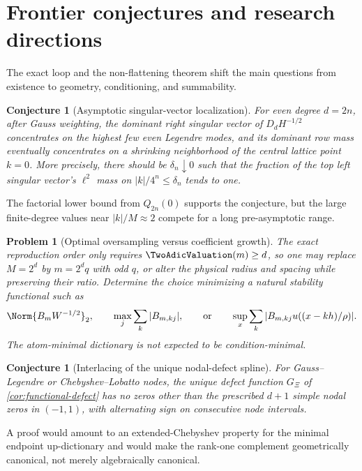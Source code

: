 \documentclass[11pt]{article}
\newtheorem{conjecture}[theorem]{Conjecture}
\newtheorem{problem}[theorem]{Problem}
\theoremstyle{definition}
\theoremstyle{remark}
\begin{document}
\section{Frontier conjectures and research directions}
\label{sec:frontiers}

The exact loop and the non-flattening theorem shift the main questions from
existence to geometry, conditioning, and summability.

\begin{conjecture}[Asymptotic singular-vector localization]
\label{conj:localization}
For even degree $d=2n$, after Gauss weighting, the dominant right singular
vector of $D_dH^{-1/2}$ concentrates on the highest few even Legendre modes,
and its dominant row mass eventually concentrates on a shrinking neighborhood
of the central lattice point $k=0$.  More precisely, there should be
$\delta_n\downarrow0$ such that the fraction of the top left singular vector's
$\ell^2$ mass on $|k|/4^n\le\delta_n$ tends to one.
\end{conjecture}

The factorial lower bound from $Q_{2n}(0)$ supports the conjecture, but the
large finite-degree values near $|k|/M\approx2$ compete for a long
pre-asymptotic range.

\begin{problem}[Optimal oversampling versus coefficient growth]
\label{prob:optimal-ratio}
The exact reproduction order only requires $\TwoAdicValuation(m)\ge d$, so one may replace
$M=2^d$ by $m=2^dq$ with odd $q$, or alter the physical radius and spacing
while preserving their ratio.  Determine the choice minimizing a natural
stability functional such as
\[
 \Norm{B_mW^{-1/2}}_2,
 \qquad
 \max_j\sum_k|B_{m,kj}|,
 \qquad\text{or}\qquad
 \sup_x\sum_k|B_{m,kj}u((x-kh)/\rho)|.
\]
The atom-minimal dictionary is not expected to be condition-minimal.
\end{problem}

\begin{conjecture}[Interlacing of the unique nodal-defect spline]
\label{conj:interlacing}
For Gauss--Legendre or Chebyshev--Lobatto nodes, the unique defect function
$G_\Xi$ of \cref{cor:functional-defect} has no zeros other than the prescribed
$d+1$ simple nodal zeros in $(-1,1)$, with alternating sign on consecutive
node intervals.
\end{conjecture}

A proof would amount to an extended-Chebyshev property for the minimal
endpoint up-dictionary and would make the rank-one complement geometrically
canonical, not merely algebraically canonical.
\end{document}
